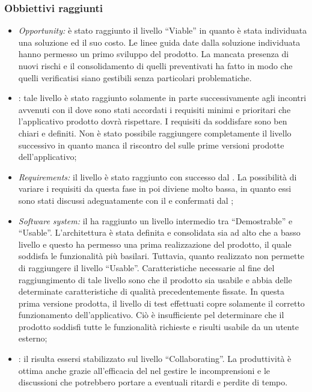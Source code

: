 \subsubsection{Obbiettivi raggiunti}
\begin{itemize}
\item \textit{Opportunity:} è stato raggiunto il livello ``Viable'' in quanto è stata individuata una soluzione ed il suo costo. Le linee guida date dalla soluzione individuata hanno permesso un primo sviluppo del prodotto.
La mancata presenza di nuovi rischi e il consolidamento di quelli preventivati ha fatto in modo che quelli verificatisi siano gestibili senza particolari problematiche.
\item {}:  tale livello è stato raggiunto solamente in parte successivamente agli incontri avvenuti con il  dove sono stati accordati i requisiti minimi e prioritari che l'applicativo prodotto dovrà rispettare.
I requisiti da soddisfare sono ben chiari e definiti.
Non è stato possibile raggiungere completamente il livello successivo in quanto manca il riscontro del  sulle prime versioni prodotte dell'applicativo;
\item \textit{Requirements:}  il livello è stato raggiunto con successo dal . La possibilità di variare i requisiti da questa fase in poi diviene molto bassa, in quanto essi sono stati discussi adeguatamente con il  e confermati dal ;
\item \textit{Software system:} il  ha raggiunto un livello intermedio tra ``Demostrable'' e ``Usable''.
L'architettura è stata definita e consolidata sia ad alto che a basso livello e questo ha permesso una prima realizzazione del prodotto, il quale soddisfa le funzionalità più basilari.
Tuttavia, quanto realizzato non permette di raggiungere il livello ``Usable''.
Caratteristiche necessarie al fine del raggiungimento di tale livello sono che il prodotto sia usabile e abbia delle determinate caratteristiche di qualità precedentemente fissate.
In questa prima versione prodotta, il livello di test effettuati copre solamente il corretto funzionamento dell'applicativo. Ciò è insufficiente pel determinare che il prodotto soddisfi tutte le funzionalità richieste e risulti usabile da un utente esterno;
\item {}: il  risulta essersi stabilizzato sul livello ``Collaborating''.
La produttività è ottima anche grazie all'efficacia del \rRP nel gestire le incomprensioni e le discussioni che potrebbero portare a eventuali ritardi e perdite di tempo.

\end{itemize}
